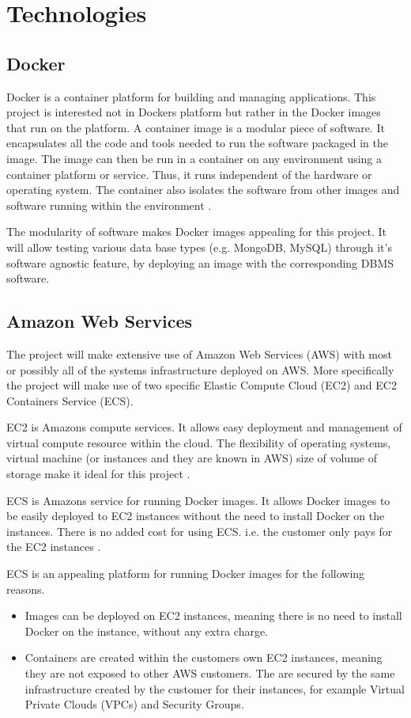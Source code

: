 \section{Technologies}

\subsection{Docker}
Docker is a container platform for building and managing applications. This project is interested not in Dockers platform but rather in the Docker images that run on the platform. A container image is a modular piece of software. It encapsulates all the code and tools needed to run the software packaged in the image. The image can then be run in a container on any environment using a container platform or service. Thus, it runs independent of the hardware or operating system. The container also isolates the software from other images and software running within the environment \citep{docker}.

The modularity of software makes Docker images appealing for this project. It will allow testing various data base types (e.g. MongoDB, MySQL) through it's software agnostic feature, by deploying an image with the corresponding DBMS software.

\subsection{Amazon Web Services}
The project will make extensive use of Amazon Web Services (AWS) with most or possibly all of the systems infrastructure deployed on AWS. More specifically the project will make use of two specific Elastic Compute Cloud (EC2) and EC2 Containers Service (ECS).

EC2 is Amazons compute services. It allows easy deployment and management of virtual compute resource within the cloud. The flexibility of operating systems, virtual machine (or instances and they are known in AWS) size of volume of storage make it ideal for this project \citep{ec2}.

ECS is Amazons service for running Docker images. It allows Docker images to be easily deployed to EC2 instances without the need to install Docker on the instances. There is no added cost for using ECS. i.e. the customer only pays for the EC2 instances \citep{ecs}. 

ECS is an appealing platform for running Docker images for the following reasons.
\begin{itemize}
	\item Images can be deployed on EC2 instances, meaning there is no need to install Docker on the instance, without any extra charge.
	\item Containers are created within the customers own EC2 instances, meaning they are not exposed to other AWS customers. The are secured by the same infrastructure created by the customer for their instances, for example Virtual Private Clouds (VPCs) and Security Groups.
	
\end{itemize}


